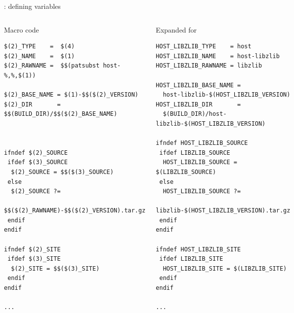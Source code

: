 \begin{frame}[fragile]{: defining variables}

\begin{columns}

\begin{block}{Macro code}
\begin{verbatim}
$(2)_TYPE    =  $(4)
$(2)_NAME    =  $(1)
$(2)_RAWNAME =  $$(patsubst host-%,%,$(1))

$(2)_BASE_NAME = $(1)-$$($(2)_VERSION)
$(2)_DIR       = $$(BUILD_DIR)/$$($(2)_BASE_NAME)



ifndef $(2)_SOURCE
 ifdef $(3)_SOURCE
  $(2)_SOURCE = $$($(3)_SOURCE)
 else
  $(2)_SOURCE ?=
    $$($(2)_RAWNAME)-$$($(2)_VERSION).tar.gz
 endif
endif

ifndef $(2)_SITE
 ifdef $(3)_SITE
  $(2)_SITE = $$($(3)_SITE)
 endif
endif

...
\end{verbatim}
\end{block}

\begin{block}{Expanded for }
\begin{verbatim}
HOST_LIBZLIB_TYPE    = host
HOST_LIBZLIB_NAME    = host-libzlib
HOST_LIBZLIB_RAWNAME = libzlib

HOST_LIBZLIB_BASE_NAME =
  host-libzlib-$(HOST_LIBZLIB_VERSION)
HOST_LIBZLIB_DIR       =
  $(BUILD_DIR)/host-libzlib-$(HOST_LIBZLIB_VERSION)

ifndef HOST_LIBZLIB_SOURCE
 ifdef LIBZLIB_SOURCE
  HOST_LIBZLIB_SOURCE = $(LIBZLIB_SOURCE)
 else
  HOST_LIBZLIB_SOURCE ?=
   libzlib-$(HOST_LIBZLIB_VERSION).tar.gz
 endif
endif

ifndef HOST_LIBZLIB_SITE
 ifdef LIBZLIB_SITE
  HOST_LIBZLIB_SITE = $(LIBZLIB_SITE)
 endif
endif

...
\end{verbatim}
\end{block}

\end{columns}

\end{frame}

